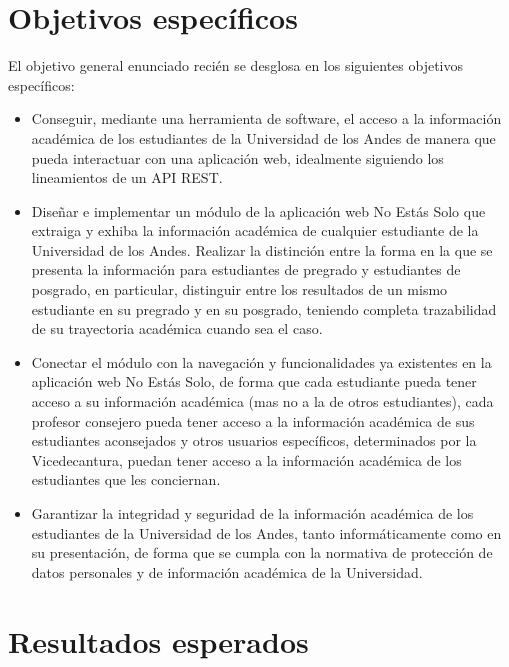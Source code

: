 \documentclass{fmbproyectogrado}
\begin{document}
\section{Objetivos específicos}

El objetivo general enunciado recién se desglosa en los siguientes objetivos específicos:
\begin{itemize}
  \item Conseguir, mediante una herramienta de software, el acceso a la información académica de los estudiantes de la Universidad de los Andes de manera que pueda interactuar con una aplicación web, idealmente siguiendo los lineamientos de un API REST.
  \item Diseñar e implementar un módulo de la aplicación web No Estás Solo que extraiga y exhiba la información académica de cualquier estudiante de la Universidad de los Andes. Realizar la distinción entre la forma en la que se presenta la información para estudiantes de pregrado y estudiantes de posgrado, en particular, distinguir entre los resultados de un mismo estudiante en su pregrado y en su posgrado, teniendo completa trazabilidad de su trayectoria académica cuando sea el caso.
  \item Conectar el módulo con la navegación y funcionalidades ya existentes en la aplicación web No Estás Solo, de forma que cada estudiante pueda tener acceso a su información académica (mas no a la de otros estudiantes), cada profesor consejero pueda tener acceso a la información académica de sus estudiantes aconsejados y otros usuarios específicos, determinados por la Vicedecantura, puedan tener acceso a la información académica de los estudiantes que les conciernan.
  \item Garantizar la integridad y seguridad de la información académica de los estudiantes de la Universidad de los Andes, tanto informáticamente como en su presentación, de forma que se cumpla con la normativa de protección de datos personales y de información académica de la Universidad.
\end{itemize}

\section{Resultados esperados}
\end{document}
